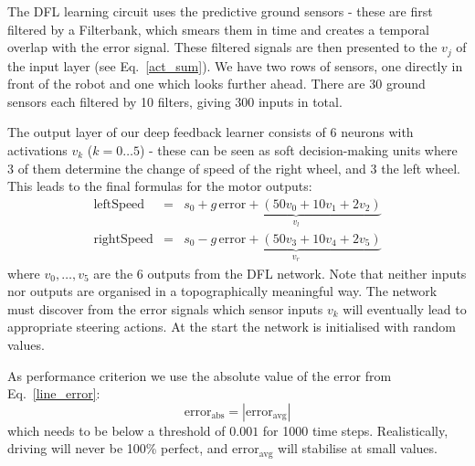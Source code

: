 \documentclass{aamas2018}
\begin{document}
The DFL learning circuit uses the predictive ground sensors - these
are first filtered by a Filterbank, which smears them in time and
creates a temporal overlap with the error signal. These filtered
signals are then presented to the $v_j$ of the input layer (see
Eq.~\ref{act_sum}). We have two rows of sensors, one directly in front
of the robot and one which looks further ahead. There are 30 ground
sensors each filtered by 10 filters, giving 300 inputs in total.

The output layer of our deep feedback learner consists of 6 neurons
with activations $v_k$ ($k=0 \ldots 5$) - these can be seen as soft
decision-making units where 3 of them determine the change of speed of
the right wheel, and 3 the left wheel. This leads to the
final formulas for the motor outputs:
\begin{eqnarray}
  \mathrm{leftSpeed} &=& s_0 + \underbrace{g\, \mathrm{error} + \left( 50 v_0 + 10 v_1 + 2 v_2 \right)}_{v_l} \\
  \mathrm{rightSpeed} &=& s_0 - \underbrace{g\, \mathrm{error} + \left( 50 v_3 + 10 v_4 + 2 v_5 \right)}_{v_r}
\end{eqnarray}
where $v_0, \ldots, v_5$ are the 6 outputs from the DFL network. Note
that neither inputs nor outputs are organised in a topographically
meaningful way. The network must discover from the error signals
which sensor inputs $v_k$ will eventually lead to appropriate steering
actions. At the start the network is initialised with random values.

As performance criterion we use the absolute value of the error from
Eq.~\ref{line_error}:
\begin{equation}
  \mathrm{error}_\mathrm{abs} =  |\mathrm{error}_\mathrm{avg}| \label{line_sqerr}
\end{equation}
which needs to be below a threshold of $0.001$ for 1000 time steps.
Realistically, driving will never be 100\% perfect, and $\mathrm{error}_\mathrm{avg}$
will stabilise at small values.
\end{document}

